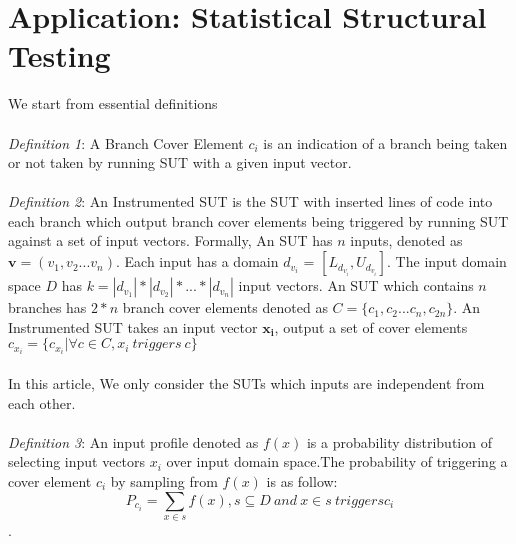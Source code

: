 \documentclass[conference]{IEEEtran}
\renewcommand{\vec}[1]{\mathbf{#1}}
\begin{document}
\section{Application: Statistical Structural Testing}
We start from essential definitions\\\\
\noindent\emph{Definition 1}: A Branch Cover Element \(c_i\) is an indication of a branch being taken or not taken by running SUT with a given input vector.\\\\
\noindent\emph{Definition 2}: An Instrumented SUT is the SUT with inserted lines of code into each branch which output branch cover elements being triggered by running SUT against a set of input vectors. Formally, An SUT has \(n\) inputs, denoted as \(\vec{v}=(v_1,v_2...v_n)\). Each input has a domain \(d_{v_i}\) = \([L_{d_{v_i}},U_{d_{v_i}}]\). The input domain space \(D\) has \(k = |d_{v_1}|*|d_{v_2}|*...*|d_{v_n}|\) input vectors. An SUT which contains \(n\) branches has \(2*n\) branch cover elements denoted as \(C = {\{c_1,c_2 ...c_n, c_{2n}\}}\). An Instrumented SUT takes an input vector \(\vec{x_i}\), output a set of cover elements \(c_{x_i} = \{c_{x_i}| \forall c \in C, x_i\ triggers\ c\}\)  \\\\
In this article, We only consider the SUTs which inputs are independent from each other.\\\\

\noindent\emph{Definition 3}: An input profile denoted as \(f(x) \) is a probability distribution of selecting input vectors \(x_i\) over input domain space.The probability of triggering a cover element \(c_i\) by sampling from \(f(x)\) is as follow:\[P_{c_i} = \sum_{x \in s} f(x), s \subseteq D \ and \ x \in s \ triggers {c_i}\]. 
\end{document}
